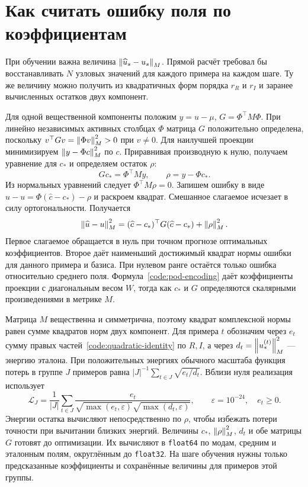 \section{Как считать ошибку поля по коэффициентам}
\label{code:fem-loss}

При обучении важна величина $\left\lVert \widehat u_s-u_s\right\rVert_M$. Прямой расчёт
требовал бы восстанавливать $N$ узловых значений для каждого примера
на каждом шаге. Ту же величину можно получить из квадратичных форм
порядка $r_R$ и $r_I$ и заранее вычисленных остатков двух компонент.

Для одной вещественной компоненты положим $y=u-\mu$,
$G=\Phi^\top M\Phi$. При линейно независимых активных столбцах
$\Phi$ матрица $G$ положительно определена, поскольку
$v^\top Gv=\left\lVert \Phi v\right\rVert_M^2>0$ при $v\ne0$. Для наилучшей проекции
минимизируем $\left\lVert y-\Phi c\right\rVert_M^2$ по $c$. Приравнивая производную
к нулю, получаем уравнение для $c_*$ и определяем остаток $\rho$:
\begin{equation}
 G c_* =\Phi^\top M y,\qquad \rho=y-\Phi c_* .
 \label{code:consistent-projection}
\end{equation}
Из нормальных уравнений следует $\Phi^\top M\rho=0$. Запишем ошибку
в виде $\widehat u-u=\Phi(\widehat c-c_*)-\rho$ и раскроем квадрат.
Смешанное слагаемое исчезает в силу ортогональности. Получается
\begin{equation}
 \left\lVert \widehat u-u\right\rVert_M^2
   =(\widehat c-c_*)^\top G(\widehat c-c_*)+\left\lVert \rho\right\rVert_M^2 .
 \label{code:quadratic-identity}
\end{equation}
Первое слагаемое обращается в нуль при точном прогнозе оптимальных
коэффициентов. Второе даёт наименьший достижимый квадрат нормы ошибки
для данного примера и базиса. При нулевом ранге остаётся только ошибка
относительно среднего поля. Формула~\eqref{code:pod-encoding} даёт
коэффициенты проекции с диагональным весом $W$, тогда как $c_*$ и $G$
определяются скалярными произведениями в метрике $M$.

Матрица $M$ вещественна и симметрична, поэтому квадрат комплексной
нормы равен сумме квадратов норм двух компонент. Для примера $t$
обозначим через $e_t$ сумму правых частей~\eqref{code:quadratic-identity}
по $R,I$, а через $d_t=\left\lVert u_s^{(t)}\right\rVert_M^2$ --- энергию эталона.
При положительных энергиях обычного масштаба функция потерь в группе
$J$ примеров равна $|J|^{-1}\sum_{t\in J}\sqrt{e_t/d_t}$.
Вблизи нуля реализация использует
\begin{equation}
 \mathcal L_J=\frac1{|J|}\sum_{t\in J}
 \frac{e_t}{\sqrt{\max(e_t,\varepsilon)}\sqrt{\max(d_t,\varepsilon)}},
 \qquad \varepsilon=10^{-24},\quad e_t\ge0 .
 \label{code:stable-loss}
\end{equation}
Энергии остатка вычисляют непосредственно по $\rho$, чтобы избежать
потери точности при вычитании близких энергий. Величины $c_*$,
$\left\lVert \rho\right\rVert_M^2$, $d_t$ и обе матрицы $G$ готовят до оптимизации.
Их вычисляют в \texttt{float64} по модам, средним и эталонным полям,
округлённым до \texttt{float32}.
На шаге обучения нужны только предсказанные коэффициенты и сохранённые
величины для примеров этой группы.

